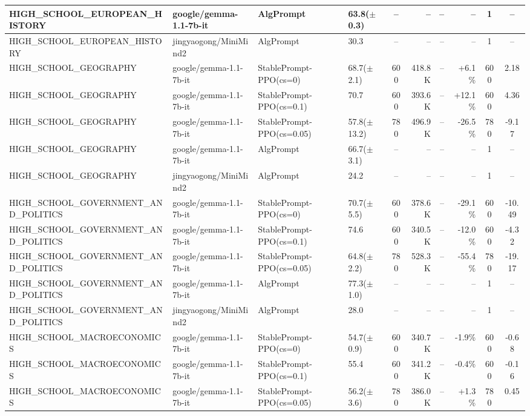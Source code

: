 {\begin{longtable}{@{}p{5.5cm}p{4.5cm}p{2.5cm}lcrrrcc@{}}
HIGH\_SCHOOL\_EUROPEAN\_HISTORY & google/gemma-1.1-7b-it & AlgPrompt & 63.8($\pm$0.3) & -- & -- & -- & -- & 1 & -- \\
\midrule
HIGH\_SCHOOL\_EUROPEAN\_HISTORY & jingyaogong/MiniMind2 & AlgPrompt & 30.3 & -- & -- & -- & -- & 1 & -- \\
\midrule
HIGH\_SCHOOL\_GEOGRAPHY & google/gemma-1.1-7b-it & StablePrompt-PPO(cs=0) & 68.7($\pm$2.1) & 600 & 418.8K & -- & +6.1\% & 600 & 2.18 \\
HIGH\_SCHOOL\_GEOGRAPHY & google/gemma-1.1-7b-it & StablePrompt-PPO(cs=0.1) & 70.7 & 600 & 393.6K & -- & +12.1\% & 600 & 4.36 \\
HIGH\_SCHOOL\_GEOGRAPHY & google/gemma-1.1-7b-it & StablePrompt-PPO(cs=0.05) & 57.8($\pm$13.2) & 780 & 496.9K & -- & -26.5\% & 780 & -9.17 \\
HIGH\_SCHOOL\_GEOGRAPHY & google/gemma-1.1-7b-it & AlgPrompt & 66.7($\pm$3.1) & -- & -- & -- & -- & 1 & -- \\
\midrule
HIGH\_SCHOOL\_GEOGRAPHY & jingyaogong/MiniMind2 & AlgPrompt & 24.2 & -- & -- & -- & -- & 1 & -- \\
\midrule
HIGH\_SCHOOL\_GOVERNMENT\_AND\_POLITICS & google/gemma-1.1-7b-it & StablePrompt-PPO(cs=0) & 70.7($\pm$5.5) & 600 & 378.6K & -- & -29.1\% & 600 & -10.49 \\
HIGH\_SCHOOL\_GOVERNMENT\_AND\_POLITICS & google/gemma-1.1-7b-it & StablePrompt-PPO(cs=0.1) & 74.6 & 600 & 340.5K & -- & -12.0\% & 600 & -4.32 \\
HIGH\_SCHOOL\_GOVERNMENT\_AND\_POLITICS & google/gemma-1.1-7b-it & StablePrompt-PPO(cs=0.05) & 64.8($\pm$2.2) & 780 & 528.3K & -- & -55.4\% & 780 & -19.17 \\
HIGH\_SCHOOL\_GOVERNMENT\_AND\_POLITICS & google/gemma-1.1-7b-it & AlgPrompt & 77.3($\pm$1.0) & -- & -- & -- & -- & 1 & -- \\
\midrule
HIGH\_SCHOOL\_GOVERNMENT\_AND\_POLITICS & jingyaogong/MiniMind2 & AlgPrompt & 28.0 & -- & -- & -- & -- & 1 & -- \\
\midrule
HIGH\_SCHOOL\_MACROECONOMICS & google/gemma-1.1-7b-it & StablePrompt-PPO(cs=0) & 54.7($\pm$0.9) & 600 & 340.7K & -- & -1.9\% & 600 & -0.68 \\
HIGH\_SCHOOL\_MACROECONOMICS & google/gemma-1.1-7b-it & StablePrompt-PPO(cs=0.1) & 55.4 & 600 & 341.2K & -- & -0.4\% & 600 & -0.16 \\
HIGH\_SCHOOL\_MACROECONOMICS & google/gemma-1.1-7b-it & StablePrompt-PPO(cs=0.05) & 56.2($\pm$3.6) & 780 & 386.0K & -- & +1.3\% & 780 & 0.45 \\

\end{longtable}}
